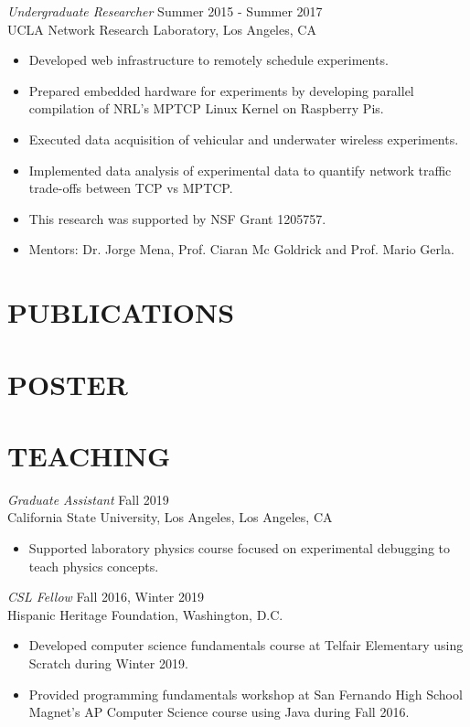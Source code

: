 \documentclass[margin,line]{res}
\let\origsection\section%
\let\section\subsection%
\let\section\origsection%
\begin{document}
\begin{resume}
{\sl Undergraduate Researcher} \hfill Summer 2015 - Summer 2017 \\
                UCLA Network Research Laboratory, 
                Los Angeles, CA 
                 \begin{itemize}  \itemsep -2pt %
                 \item Developed web infrastructure to remotely schedule experiments.
                \item Prepared embedded hardware for experiments by developing parallel compilation of NRL's MPTCP Linux Kernel on Raspberry Pis.
                \item Executed data acquisition of vehicular and underwater wireless experiments.
                \item Implemented data analysis of experimental data to quantify network traffic trade-offs between TCP vs MPTCP.
                \item This research was supported by NSF Grant 1205757. 
                \item Mentors: Dr. Jorge Mena, Prof. Ciaran Mc Goldrick and Prof. Mario Gerla.
                \end{itemize}  

\section{\mysidestyle  PUBLICATIONS}  
\printbibliography[heading=none, type=inproceedings,sorting=ynt ]

\section{\mysidestyle  POSTER}
\printbibliography[heading=none, type=misc]     

\section{\mysidestyle  TEACHING}  

{\sl Graduate Assistant} \hfill Fall 2019 \\
California State University, Los Angeles, Los Angeles, CA
\begin{itemize} \itemsep -2pt 
\item Supported laboratory physics course focused on experimental debugging to teach physics concepts.
\end{itemize}

{\sl CSL Fellow} \hfill        Fall 2016, Winter 2019  \\
Hispanic Heritage Foundation,   Washington, D.C.
\begin{itemize} \itemsep -2pt 
	\item Developed computer science fundamentals course at Telfair Elementary using Scratch during Winter 2019.
	\item Provided programming fundamentals workshop at San Fernando High School Magnet's AP Computer Science course using Java during Fall 2016.
\end{itemize}


\end{resume}
\end{document}
